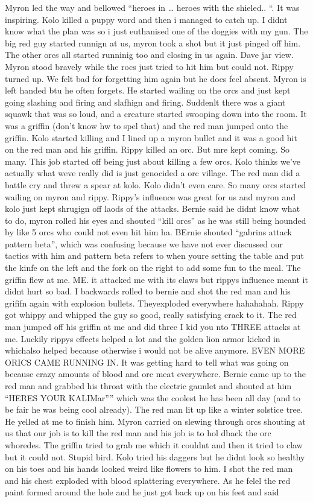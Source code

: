 \begin{multicols}{2}
Myron led the way and bellowed “heroes in … heroes with the shieled.. “. It was inspiring. Kolo killed a puppy word and then i managed to catch up. I didnt know what the plan was so i just euthanised one of the doggies with my gun. The big red guy started runnign at us, myron took a shot but it just pinged off him. The other orcs all started runninig too and closing in us again. Dave jar view. Myron stood bravely while the rocs just tried to hit him but could not. Rippy turned up. We felt bad for forgetting him again but he does feel absent. Myron is left handed btu he often forgets. He started wailing on the orcs and just kept going slashing and firing and slafhign and firing. Suddenlt there was a giant squawk that was so loud, and a creature started swooping down into the room. It was a griffin (don’t know hw to spel that) and the red man jumped onto the griffin. Kolo started killing and I lined up a myron bullet and it was a good hit on the red man and his griffin. Rippy killed an orc. But mre kept coming. So many. This job started off being just about killing a few orcs. Kolo thinks we’ve actually what weve really did is just genocided a orc village. The red man did a battle cry and threw a spear at kolo. Kolo didn’t even care. So many orcs started wailing on myron and rippy. Rippy’s influence was great for us and myron and kolo just kept shrugign off laods of the attacks. Bernie said he didnt know what to do, myron rolled his eyes and shouted “kill orcs” as he was still being hounded by like 5 orcs who could not even hit him ha. BErnie shouted “gabrins attack pattern beta”, which was confusing because we have not ever discussed our tactics with him and pattern beta refers to when youre setting the table and put the kinfe on the left and the fork on the right to add some fun to the meal. The griffin flew at me. ME. it attacked me with its claws but rippys influence meant it didnt hurt so bad. I backwards rolled to bernie and shot the red man and his grififn again with explosion bullets. Theyexploded everywhere hahahahah. Rippy got whippy and whipped the guy so good, really satisfying crack to it. The red man jumped off his griffin at me and did three I kid you nto THREE attacks at me. Luckily rippys effects helped a lot and the golden lion armor kicked in whichalso helped because otherwise i would not be alive anymore. EVEN MORE ORICS CAME RUNNING IN. It was getting hard to tell what was going on because crazy amounts of blood and orc meat everywhere. Bernie came up to the red man and grabbed his throat with the electric gaunlet and shouted at him “HERES YOUR KALIMar”” which was the coolest he has been all day (and to be fair he was being cool already). The red man lit up like a winter solstice tree. He yelled at me to finish him. Myron carried on slewing through orcs shouting at us that our job is to kill the red man and his job is to hol dback the orc whoredes. The griffin tried to grab me which it couldnt and then it tried to claw but it could not. Stupid bird. Kolo tried his daggers but he didnt look so healthy on his toes and his hands looked weird like flowers to him. I shot the red man and his chest exploded with blood splattering everywhere. As he felel the red paint formed around the hole and he just got back up on his feet and said 
\end{multicols}
